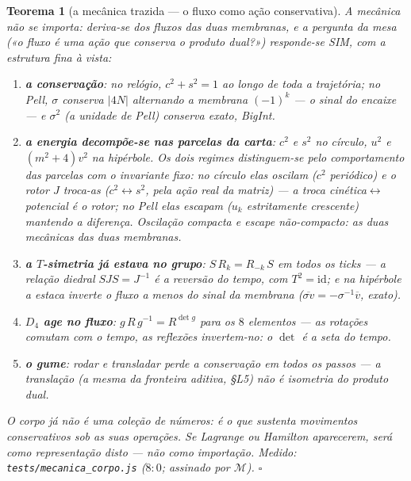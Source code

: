 \documentclass[11pt,a4paper]{article}
\newtheorem{teorema}{Teorema}
\newcommand{\code}[1]{\texttt{\small #1}}
\begin{document}
\begin{teorema}[a mecânica trazida --- o fluxo como ação
conservativa]\label{thm:mecanica}
A mecânica não se importa: \emph{deriva-se} dos fluxos das duas
membranas, e a pergunta da mesa («o fluxo é uma ação que conserva o
produto dual?») responde-se SIM, com a estrutura fina à vista:
\begin{enumerate}
\item \textbf{a conservação}: no relógio, $c^{2}+s^{2}=1$ ao longo de
toda a trajetória; no Pell, $\sigma$ conserva $|4N|$ \emph{alternando
a membrana} $(-1)^{k}$ --- o sinal do encaixe --- e $\sigma^{2}$ (a
unidade de Pell) conserva \emph{exato}, BigInt.
\item \textbf{a energia decompõe-se nas parcelas da carta}: $c^{2}$ e
$s^{2}$ no círculo, $u^{2}$ e $(m^{2}{+}4)v^{2}$ na hipérbole. Os dois
regimes distinguem-se pelo comportamento das parcelas com o invariante
fixo: no círculo elas \emph{oscilam} ($c^{2}$ periódico) e o rotor $J$
\emph{troca-as} ($c^{2}\leftrightarrow s^{2}$, pela ação real da
matriz) --- a troca cinética$\leftrightarrow$potencial é o rotor; no
Pell elas \emph{escapam} ($u_{k}$ estritamente crescente) mantendo a
diferença. Oscilação compacta e escape não-compacto: as duas mecânicas
das duas membranas.
\item \textbf{a $T$-simetria já estava no grupo}:
$S\,R_{k}=R_{-k}\,S$ em todos os ticks --- a relação diedral
$SJS=J^{-1}$ \emph{é} a reversão do tempo, com $T^{2}=\mathrm{id}$; e
na hipérbole a estaca inverte o fluxo a menos do sinal da membrana
($\overline{\sigma v}=-\sigma^{-1}\overline{v}$, exato).
\item \textbf{$D_{4}$ age no fluxo}: $g\,R\,g^{-1}=R^{\det g}$ para
os $8$ elementos --- as rotações comutam com o tempo, as reflexões
invertem-no: \emph{o $\det$ é a seta do tempo}.
\item \textbf{o gume}: rodar \emph{e} transladar perde a conservação
em todos os passos --- a translação (a mesma da fronteira aditiva,
\S L5) não é isometria do produto dual.
\end{enumerate}
O corpo já não é uma coleção de números: é \emph{o que sustenta
movimentos conservativos sob as suas operações}. Se Lagrange ou
Hamilton aparecerem, será como representação disto --- não como
importação.
\emph{Medido:} \code{tests/mecanica\_corpo.js} ($8{:}0$; assinado por
$\mathcal{M}$).
$\square$
\end{teorema}
\end{document}
